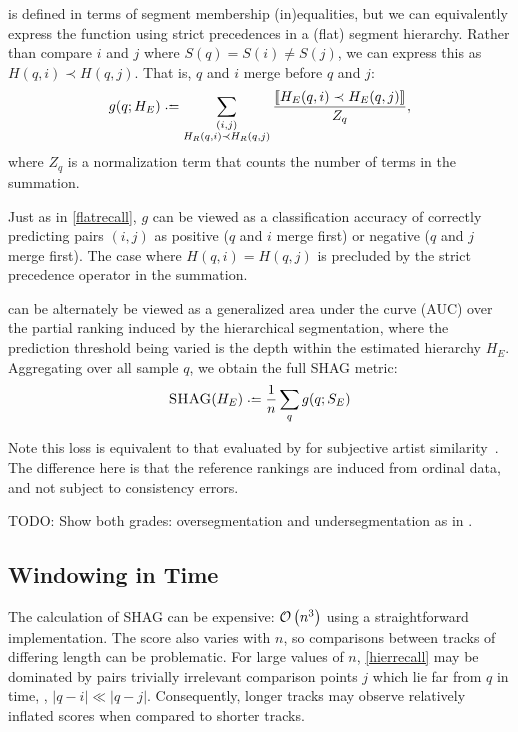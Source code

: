 \documentclass{article}
\def\shag{\ensuremath{\text{\textsc{SHAG}}}}
\begin{document}
 is defined in terms of segment membership (in)equalities, but 
we can equivalently express the function using strict precedences in a (flat)
segment hierarchy.
Rather than compare $i$ and $j$ where $S(q) = S(i) \neq S(j)$, we can express this as $H(q, i) \prec H(q, j)$.
That is, $q$ and $i$ merge before $q$ and $j$:
\begin{equation}
g(q ; H_E) \defeq \sum_{\substack{(i, j)\\ H_R(q, i) \prec H_R(q, j)}}
\frac{\ind{H_E(q, i) \prec H_E(q, j)}}{Z_q},\label{hierrecall}
\end{equation}
where $Z_q$ is a normalization term that counts the number of terms in the summation.

Just as in \cref{flatrecall}, $g$ can be viewed as a classification accuracy of
correctly predicting pairs $(i, j)$ as positive ($q$ and $i$ merge first) or negative
($q$ and $j$ merge first).  The case where $H(q, i) = H(q, j)$ is precluded by the
strict precedence operator in the summation.

 can be alternately be viewed as a generalized area under the curve
(AUC) over the partial ranking induced by the hierarchical segmentation, where the
prediction threshold being varied is the depth within the estimated hierarchy $H_E$.
Aggregating over all sample $q$, we obtain the full SHAG metric:
\begin{equation}
\shag(H_E) \defeq \frac{1}{n} \sum_q g(q ; S_E)
\end{equation}

Note this loss is equivalent to that evaluated by for subjective artist similarity~\cite{mcfee2011}.
The difference here is that the reference rankings are induced from ordinal data, and not subject to consistency errors.

TODO: Show both grades: oversegmentation and undersegmentation as in \cite{Lukashevich2008}.

\subsection{Windowing in Time}

The calculation of SHAG can be expensive: $\mathcal{O}\left(n^3\right)$ using a straightforward 
implementation.
The score also varies with $n$, so comparisons between tracks of differing length can
be problematic.  For large values of $n$, \cref{hierrecall} may be dominated by pairs
trivially irrelevant comparison points $j$ which lie far from $q$ in time, \ie, $|q-i| \ll |q-j|$.
Consequently, longer tracks may observe relatively inflated scores when compared to shorter tracks.
\end{document}
